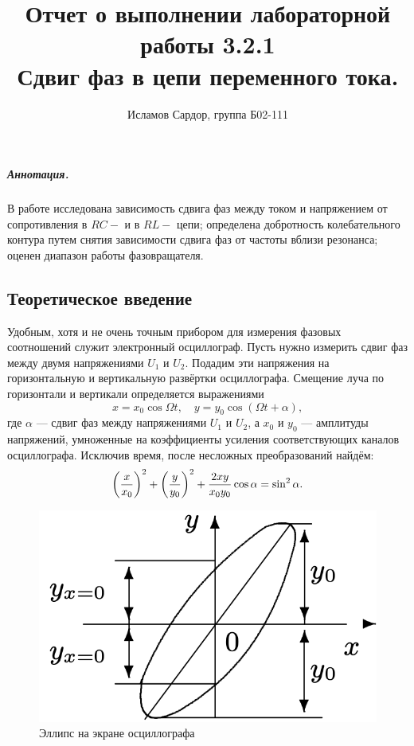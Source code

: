\documentclass[12pt,a4paper]{article}
\title{
Отчет о выполнении лабораторной работы 3.2.1 \\
Сдвиг фаз в цепи переменного тока.}
\author{Исламов Сардор, группа Б02-111}
\begin{document}
\maketitle

\subparagraph*{Аннотация.} В работе исследована зависимость сдвига фаз между током и напряжением от сопротивления в $RC -$ и в $RL - $ цепи;
определена добротность колебательного контура путем снятия зависимости сдвига фаз от частоты вблизи резонанса; 
оценен диапазон работы фазовращателя.

\subsection*{Теоретическое введение}

Удобным, хотя и не очень точным прибором для измерения фазовых соотношений служит электронный осциллограф. 
Пусть нужно измерить сдвиг фаз между двумя напряжениями $U_1$ и $U_2$. 
Подадим эти напряжения на горизонтальную и вертикальную развёртки осциллографа. 
Смещение луча по горизонтали и вертикали определяется выражениями $$x = x_0 \cos \Omega t,\quad y = y_0 \cos (\Omega t + \alpha),$$ где $\alpha$ — сдвиг фаз между напряжениями $U_1$ и $U_2$, а $x_0$ и $y_0$ — амплитуды напряжений, умноженные на коэффициенты усиления соответствующих каналов осциллографа. 
Исключив время, после несложных преобразований найдём:
\begin{equation*}
    \left( {x \over x_0}\right)^2 + \left( {y \over y_0}\right)^2 + {2xy \over x_0y_0} \cos \alpha = \sin^2 \alpha.
\end{equation*}
\hfill
\begin{figure}
    \includegraphics[width=\linewidth]{pics/ellipse.png}
    \caption{Эллипс на экране осциллографа}
\end{figure}
\end{document}
